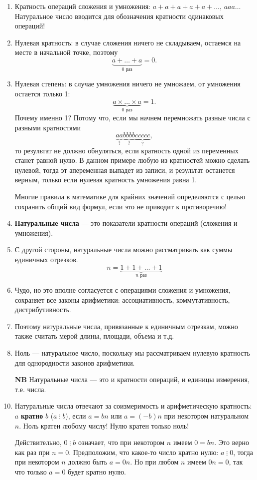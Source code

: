 \begin{enumerate}
\item Кратность операций сложения и умножения: $a+a+a+a+a+\dots$, $a a a\ldots$ Натуральное число вводится для обозначения кратности одинаковых операций!
\item Нулевая кратность: в случае сложения ничего не складываем, остаемся на месте в начальной точке, поэтому
$$
\underbrace{a+\dots+a}_{0\mbox{ раз}}=0.
$$
\item Нулевая степень: в случае умножения ничего не умножаем, от умножения остается только 1:
$$
\underbrace{a\times\dots\times a}_{0\mbox{ раз}}=1.
$$
Почему именно 1? Потому что, если мы начнем перемножать разные числа с разными кратностями
$$
\underbrace{aa}_{?}\underbrace{bbbb}_{?}\underbrace{ccccc}_{?},
$$
то результат не должно обнуляться, если кратность одной из переменных станет равной нулю. В данном примере любую из кратностей можно сделать нулевой, тогда эт апеременная выпадет из записи, и результат останется верным, только если нулевая кратность умножения равна 1.

Многие правила в математике для крайних значений определяются с целью сохранить общий вид формул, если это не приводит к противоречию!
\item \textbf{Натуральные числа} --- это показатели кратности операций (сложения и умножения).
\item С другой стороны, натуральные числа можно рассматривать как суммы единичных отрезков.
$$
n=\underbrace{1+1+\dots+1}_{n\mbox{ раз}}
$$
\item Чудо, но это вполне согласуется с операциями сложения и умножения, сохраняет все законы арифметики: ассоциативность, коммутативность, дистрибутивность.
\item Поэтому натуральные числа, привязанные к единичным отрезкам, можно также считать мерой длины, площади, объема и т.д.
\item Ноль --- натуральное число, поскольку мы рассматриваем нулевую кратность для однородности законов арифметики.
\item[\bf NB] Натуральные числа --- это и кратности операций, и единицы измерения, т.е. числа.
\item Натуральные числа отвечают за соизмеримость и арифметическую кратность: $a$ \textbf{кратно} $b$ ($a\mathop{\vdots} b$), если $a=bn$ или $a=(-b)n$ при некотором натуральном $n$. Ноль кратен любому числу! Нулю кратен только ноль!

Действительно, $0\mathop{\vdots} b$ означает, что при некотором $n$ имеем $0=bn$. Это верно как раз при $n=0$. Предположим, что какое-то число кратно нулю: $a\mathop{\vdots} 0$, тогда при некотором $n$ должно быть $a=0n$. Но при любом $n$ имеем $0n=0$, так что только $a=0$ будет кратно нулю.


\end{enumerate}

